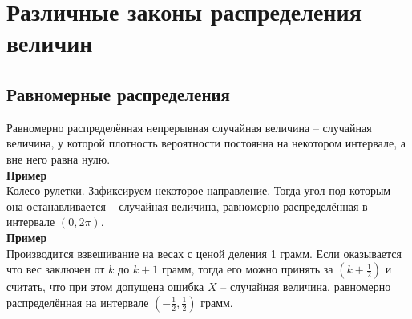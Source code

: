 \documentclass[russian, 12pt, fleqn]{article}
\begin{document}
\section{Различные законы распределения величин}
\subsection{Равномерные распределения}
\noindent
Равномерно распределённая непрерывная случайная величина -- случайная величина, у которой плотность вероятности постоянна на некотором интервале, а вне него равна нулю.\\
\textbf{Пример\ }\\
Колесо рулетки. Зафиксируем некоторое направление. Тогда угол под которым она останавливается -- случайная величина, равномерно распределённая в интервале $(0, 2\pi)$.\\
\textbf{Пример\ }\\
Производится взвешивание на весах с ценой деления 1 грамм. Если оказывается что вес заключен от $k$ до $k + 1$ грамм, тогда его можно принять за $(k + \frac{1}{2})$ и считать, что при этом допущена ошибка $X$ -- случайная величина, равномерно распределённая на интервале $(-\frac{1}{2}, \frac{1}{2})$ грамм.\\
\end{document}
